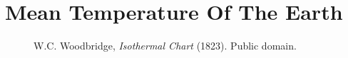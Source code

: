
\chapter[Mean Temperature Of ...]{Mean Temperature Of The Earth}

\begin{figure}[h]
    \begin{centering}
        \caption{\footnotesize W.C. Woodbridge, \emph{Isothermal Chart} (1823). Public domain.}
    \end{centering}
\end{figure}

